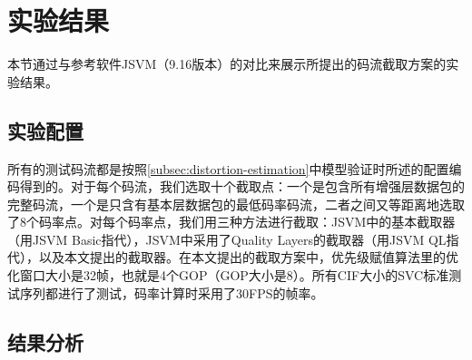 \section{实验结果}

本节通过与参考软件JSVM（9.16版本）的对比来展示所提出的码流截取方案的实验结果。

\subsection{实验配置}

所有的测试码流都是按照\ref{subsec:distortion-estimation}中模型验证时所述的配置编码得到的。对于每个码流，我们选取十个截取点：一个是包含所有增强层数据包的完整码流，一个是只含有基本层数据包的最低码率码流，二者之间又等距离地选取了8个码率点。对每个码率点，我们用三种方法进行截取：JSVM中的基本截取器（用JSVM Basic指代），JSVM中采用了Quality Layers的截取器（用JSVM QL指代），以及本文提出的截取器。在本文提出的截取方案中，优先级赋值算法里的优化窗口大小是32帧，也就是4个GOP（GOP大小是8）。所有CIF大小的SVC标准测试序列都进行了测试，码率计算时采用了30FPS的帧率。

\subsection{结果分析}


